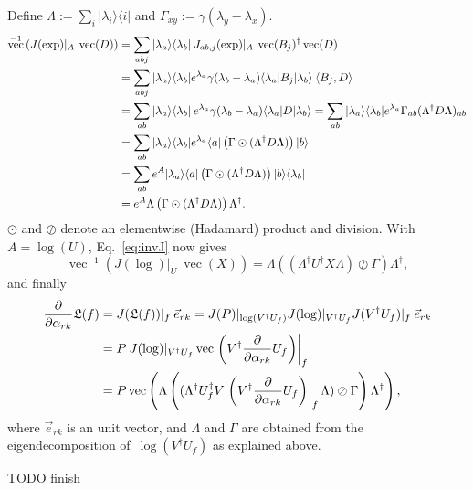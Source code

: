 \documentclass[aps,pra,12pt,showpacs,showkeys,nofootinbib,superscriptaddress,longbibliography]{revtex4}
\newcommand{\bra}[1]{\mbox{$\langle #1|$}}
\newcommand{\ket}[1]{\mbox{$|#1\rangle$}}
\newcommand{\ketbra}[2]{\mbox{$|#1\rangle\langle #2|$}}
\newcommand{\inprod}[2]{\mbox{$\langle #1, #2\rangle$}}
\DeclareMathOperator{\VEC}{vec}
\newcommand{\mf}[1]{\mathfrak{#1}}
\newcommand{\pde}[2]{\frac{\partial #1}{\partial #2}}
\newcommand{\be}{\begin{equation}}
\newcommand{\ee}{\end{equation}}
\begin{document}
Define $\Lambda := \sum_i \ketbra{\lambda_i}{i}$ and $\Gamma_{xy} := \gamma(\lambda_y-\lambda_x)$.
\begin{align}
\notag
\VEC^{-1}\left(J(\exp)|_A \: \VEC(D)\right)
&= \sum_{abj} \ketbra{\lambda_a}{\lambda_b} \: J_{ab,j}(\exp)|_A \: \VEC(B_j)^\dagger \VEC(D)\\
\notag
&= \sum_{abj} \ketbra{\lambda_a}{\lambda_b}
e^{\lambda_a} \gamma(\lambda_b - \lambda_a) \bra{\lambda_a} B_j \ket{\lambda_b} \: \inprod{B_j}{D}\\
\notag
&= \sum_{ab} \ketbra{\lambda_a}{\lambda_b} \: e^{\lambda_a} \gamma(\lambda_b -\lambda_a) \bra{\lambda_a}
D \ket{\lambda_b}
= \sum_{ab} \ketbra{\lambda_a}{\lambda_b} e^{\lambda_a} \Gamma_{ab} (\Lambda^\dagger
D \Lambda)_{ab}\\
&= \sum_{ab} \ketbra{\lambda_a}{\lambda_b} e^{\lambda_a} \bra{a} \left(\Gamma \odot
(\Lambda^\dagger D \Lambda) \right) \ket{b}\\
&= \sum_{ab} e^A \ketbra{\lambda_a}{a} \left(\Gamma \odot
(\Lambda^\dagger D \Lambda) \right) \ketbra{b}{\lambda_b}\\
&= e^A \Lambda \left(\Gamma \odot
(\Lambda^\dagger D \Lambda) \right) \Lambda^\dagger.
\end{align}
$\odot$ and $\oslash$ denote an elementwise (Hadamard) product and division.
With $A = \log(U)$, Eq.~\eqref{eq:invJ} now gives
\be
\VEC^{-1} \left( J(\log)|_U \: \VEC(X) \right)
= 
\Lambda \left((\Lambda^\dagger U^\dagger X \Lambda)
\oslash \Gamma\right) \Lambda^\dagger,
\ee
and finally
\begin{align}
\notag
\pde{}{\alpha_{rk}} \mf{L}(f)
&= J(\mf{L}(f))|_f \: \vec{e}_{rk}
= J(P)|_{\log(V^\dagger U_f)} J(\log)|_{V^\dagger U_f} J(V^\dagger U_f)|_{f} \: \vec{e}_{rk}\\
\notag
&= P \: J(\log)|_{V^\dagger U_f}
\VEC \left. \left( V^\dagger \pde{}{\alpha_{rk}} U_f \right)\right|_{f}\\
&= P \VEC \left( 
\Lambda \left((\Lambda^\dagger U_f^\dagger V
\left. \left( V^\dagger \pde{}{\alpha_{rk}} U_f \right)\right|_{f}
\Lambda) \oslash \Gamma \right) \Lambda^\dagger
\right),
\end{align}
where $\vec{e}_{rk}$ is an unit vector, and $\Lambda$ and $\Gamma$ are obtained from the eigendecomposition
of~$\log(V^\dagger U_f)$ as explained above.

TODO finish



\end{document}

